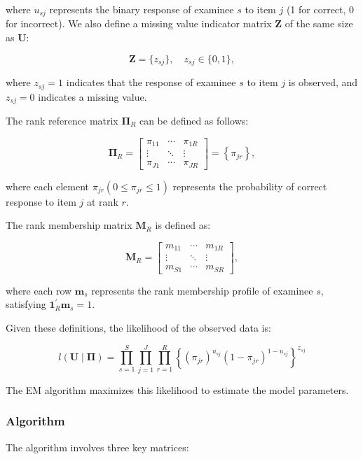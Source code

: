\noindent where \(u_{sj}\) represents the binary response of examinee \(s\) to item \(j\) (1 for correct, 0 for incorrect). We also define a missing value indicator matrix \(\mathbf{Z}\) of the same size as \(\mathbf{U}\):

\[
\mathbf{Z} = \{z_{sj}\}, \quad z_{sj} \in \{0,1\},
\]

\noindent where \(z_{sj} = 1\) indicates that the response of examinee \(s\) to item \(j\) is observed, and \(z_{sj} = 0\) indicates a missing value.

The rank reference matrix \(\boldsymbol{\Pi}_R\) can be defined as follows:

\[
\boldsymbol{\Pi}_R=\left[\begin{array}{ccc}
\pi_{11} & \cdots & \pi_{1 R} \\
\vdots & \ddots & \vdots \\
\pi_{J 1} & \cdots & \pi_{J R}
\end{array}\right]=\left\{\pi_{j r}\right\},
\]

\noindent where each element \(\pi_{jr} (0 \le \pi_{jr} \le 1)\) represents the probability of correct response to item \(j\) at rank \(r\).

The rank membership matrix \(\mathbf{M}_R\) is defined as:

\[
\mathbf{M}_R=\left[\begin{array}{ccc}
m_{11} & \cdots & m_{1 R} \\
\vdots & \ddots & \vdots \\
m_{S 1} & \cdots & m_{S R}
\end{array}\right],
\]

\noindent where each row \(\mathbf{m}_s\) represents the rank membership profile of examinee \(s\), satisfying \(\mathbf{1}_R^{\prime} \mathbf{m}_s=1\).

Given these definitions, the likelihood of the observed data is:

\[
l\left(\mathbf{U} \mid \boldsymbol{\Pi} \right)=\prod_{s=1}^S\prod_{j=1}^J\prod_{r=1}^R\left\{\left(\pi_{jr}\right)^{u_{sj}}\left(1-\pi_{jr}\right)^{1-u_{sj}}\right\}^{z_{sj}}
\]

The EM algorithm maximizes this likelihood to estimate the model parameters.

\subsubsection{Algorithm}\label{algorithm}

The algorithm involves three key matrices:


